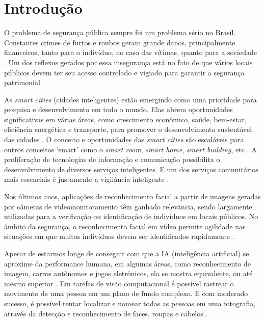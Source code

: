 \chapter{Introdução}
\label{chap:intro}
\thispagestyle{plain}

O problema de segurança pública sempre foi um problema sério no Brasil. Constantes crimes de furtos e roubos geram grande danos, principalmente financeiros, tanto para o indivíduo, no caso das vítimas, quanto para a sociedade \cite{Cerqueira2007, G12013}. Um dos reflexos gerados por essa insegurança está no fato de que vários locais públicos devem ter seu acesso controlado e vigiado para garantir a segurança patrimonial.

As \textit{smart cities} (cidades inteligentes) estão emergindo como uma prioridade para pesquisa e desenvolvimento em todo o mundo. Elas abrem oportunidades significativas em várias áreas, como crescimento econômico, saúde, bem-estar, eficiência energética e transporte, para promover o desenvolvimento sustentável das cidades \cite{Song2017}. O conceito e oportunidades das \textit{smart cities} são escaláveis para outros conceitos ‘smart’ como o \textit{smart room}, \textit{smart home}, \textit{smart building}, etc \cite{Pacheco2018}. A proliferação de tecnologias de informação e comunicação possibilita o desenvolvimento de diversos serviços inteligentes. E um dos serviços comunitários mais essenciais é justamente a vigilância inteligente \cite{Chen2016, Nikouei2018}.

Nos últimos anos, aplicações de reconhecimento facial a partir de imagens geradas por câmeras de videomonitoramento têm ganhado relevância, sendo largamente utilizadas para a verificação ou identificação de indivíduos em locais públicos. No âmbito da segurança, o reconhecimento facial em vídeo permite agilidade nas situações em que muitos indivíduos devem ser identificados rapidamente \cite{Quirita2014}.

Apesar de estarmos longe de conseguir com que a IA (inteligência artificial) se aproxime da performance humana, em algumas áreas, como reconhecimento de imagem, carros autônomos e jogos eletrônicos, ela se mostra equivalente, ou até mesmo superior \cite{Aggarwal2018}. Em tarefas de visão computacional é possível rastrear o movimento de uma pessoa em um plano de fundo complexo. E com moderado sucesso, é possível tentar localizar e nomear todas as pessoas em uma fotografia, através da detecção e reconhecimento de faces, roupas e cabelos \cite{Szeliski2011}.


